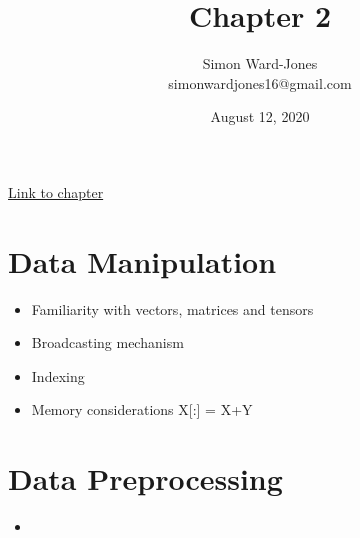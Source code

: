 \documentclass[12pt,notitlepage]{article}
\begin{document}


\title{\Large{\textbf{Chapter 2}}}
\date{August 12, 2020}
\author{Simon Ward-Jones\\simonwardjones16@gmail.com}

\maketitle
\href{https://d2l.ai/chapter_preliminaries/index.html}{Link to chapter}

\section{Data Manipulation}
\begin{itemize}
    \item Familiarity with vectors, matrices and tensors
    \item Broadcasting mechanism
    \item Indexing
    \item Memory considerations X[:] = X+Y 
\end{itemize}

\section{Data Preprocessing}
\begin{itemize}
    \item 
\end{itemize}


\vfill

\nocite{zhang2020dive}
\end{document}
